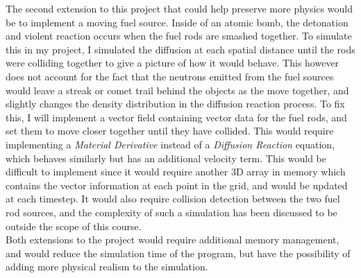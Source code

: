 \documentclass[letterpaper, 12pt]{article}
\begin{document}
      The second extension to this project that could help preserve more physics would be to implement a moving fuel source. Inside of an atomic bomb, the detonation and violent reaction occurs when the fuel rods are smashed together. To simulate this in my project, I simulated the diffusion at each spatial distance until the rods were colliding together to give a picture of how it would behave. This however does not account for the fact that the neutrons emitted from the fuel sources would leave a streak or comet trail behind the objects as the move together, and slightly changes the density distribution in the diffusion reaction process. To fix this, I will implement a vector field containing vector data for the fuel rods, and set them to move closer together until they have collided. This would require implementing a \textit{Material Derivative} instead of a \textit{Diffusion Reaction} equation, which behaves similarly but has an additional velocity term. This would be difficult to implement since it would require another 3D array in memory which contains the vector information at each point in the grid, and would be updated at each timestep. It would also require collision detection between the two fuel rod sources, and the complexity of such a simulation has been discussed to be outside the scope of this course. \\

      Both extensions to the project would require additional memory management, and would reduce the simulation time of the program, but have the possibility of adding more physical realism to the simulation. 

    
   \newpage
   \vspace{-0.5cm}
   
   
\end{document}
